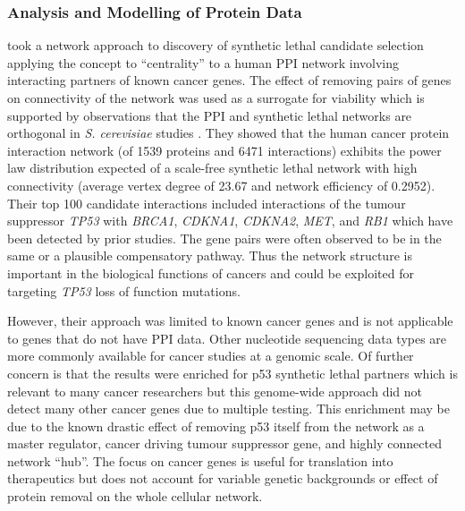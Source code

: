 \subsubsection{Analysis and Modelling of Protein Data}

\citet{Kranthi2013} took a network approach to discovery of \gls{synthetic lethal} candidate selection applying the concept to ``centrality'' to a human PPI network involving interacting partners of known cancer genes. The effect of removing pairs of genes on connectivity of the network was used as a surrogate for viability which is supported by observations that the PPI and \gls{synthetic lethal} networks are orthogonal in \textit{S. cerevisiae} studies \citep{Tong2004}. They showed that the human cancer protein interaction network (of 1539 proteins and 6471 interactions) exhibits the power law distribution expected of a scale-free \gls{synthetic lethal} network with high connectivity (average vertex degree of 23.67 and network efficiency of 0.2952). Their top 100 candidate interactions included interactions of the tumour suppressor \textit{TP53} with \textit{BRCA1}, \textit{CDKNA1}, \textit{CDKNA2}, \textit{MET}, and \textit{RB1} which have been detected by prior studies. The gene pairs were often observed to be in the same or a plausible compensatory pathway. Thus the network structure is important in the biological functions of cancers and could be exploited for targeting \textit{TP53} loss of function mutations. 

However, their approach was limited to known cancer genes and is not applicable to genes that do not have PPI data. Other nucleotide sequencing data types are more commonly available for cancer studies at a genomic scale. Of further concern is that the results were enriched for p53 \gls{synthetic lethal} partners which is relevant to many cancer researchers but this genome-wide approach did not detect many other cancer genes due to multiple testing. This enrichment may be due to the known drastic effect of removing p53 itself from the network as a master regulator, cancer driving tumour suppressor gene, and highly connected network ``hub''. The focus on cancer genes is useful for translation into therapeutics but does not account for variable genetic backgrounds or effect of protein removal on the whole cellular network.  


